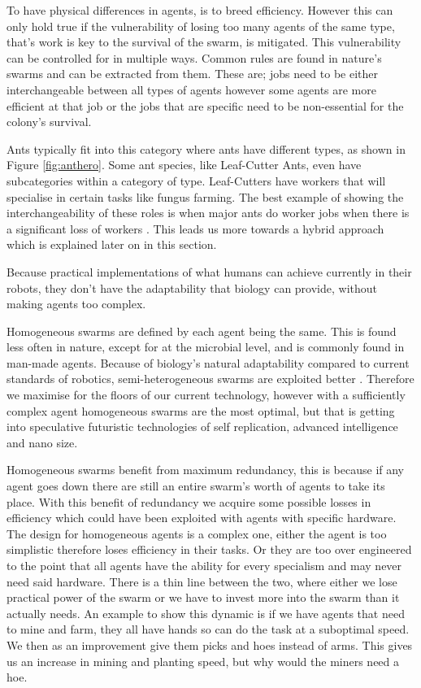 \documentclass{UoYCSproject}
\begin{document}
To have physical differences in agents, is to breed efficiency. 
However this can only hold true if the vulnerability of losing too many agents of the same type, that’s work is key to the survival of the swarm, is mitigated. 
This vulnerability can be controlled for in multiple ways. 
Common rules are found in nature's swarms and can be extracted from them. 
These are; jobs need to be either interchangeable between all types of agents however some agents are more efficient at that job \cite{Ant communication} or the jobs that are specific need to be non-essential for the colony's survival. 

Ants typically fit into this category where ants have different types, as shown in Figure \ref{fig:anthero}. 
Some ant species, like Leaf-Cutter Ants, even have subcategories within a category of type. 
Leaf-Cutters have workers that will specialise in certain tasks like fungus farming. 
The best example of showing the interchangeability of these roles is when major ants do worker jobs when there is a significant loss of workers \cite{Swarm intellegiegence}. 
This leads us more towards a hybrid approach which is explained later on in this section.

Because practical implementations of what humans can achieve currently in their robots, they don’t have the adaptability that biology can provide, without making agents too complex.

Homogeneous swarms are defined by each agent being the same. 
This is found less often in nature, except for at the microbial level, and is commonly found in man-made agents. 
Because of biology's natural adaptability compared to current standards of robotics, semi-heterogeneous swarms are exploited better \cite{Swarm robotics reviewed, Swarm intellegiegence}. 
Therefore we maximise for the floors of our current technology, however with a sufficiently complex agent homogeneous swarms are the most optimal, but that is getting into speculative futuristic technologies of self replication, advanced intelligence and nano size.

Homogeneous swarms benefit from maximum redundancy, this is because if any agent goes down there are still an entire swarm's worth of agents to take its place. 
With this benefit of redundancy we acquire some possible losses in efficiency which could have been exploited with agents with specific hardware. 
The design for homogeneous agents is a complex one, either the agent is too simplistic therefore loses efficiency in their tasks. 
Or they are too over engineered to the point that all agents have the ability for every specialism and may never need said hardware. 
There is a thin line between the two, where either we lose practical power of the swarm or we have to invest more into the swarm than it actually needs. 
An example to show this dynamic is if we have agents that need to mine and farm, they all have hands so can do the task at a suboptimal speed. 
We then as an improvement give them picks and hoes instead of arms. 
This gives us an increase in mining and planting speed, but why would the miners need a hoe.
\end{document}
